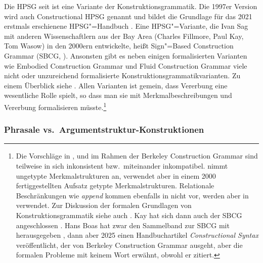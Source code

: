 Die HPSG seit  ist eine Variante der Konstruktionsgrammatik. Die 1997er Version wird auch Constructional HPSG genannt und bildet
die Grundlage für das 2021 erstmals erschienene HPSG"=Handbuch \citep{HPSGHandbook}. Eine
HPSG"=Variante, die Ivan Sag mit anderen Wissenschaftlern aus der Bay Area (Charles Fillmore, Paul
Kay, Tom Wasow) in den 2000ern entwickelte, heißt Sign"=Based Construction Grammar (SBCG,
\citealt{Sag2010b,Sag2012a}). Ansonsten gibt es neben einigen formalisierten Varianten wie Embodied
Construction Grammar \citep{BC2005a} und Fluid Construction Grammar
\citep{SDB2006a-u,SteelsFluid-ed} viele
nicht oder unzureichend formalisierte Konstruktionsgrammatikvarianten. Zu einem Überblick siehe
\citep{MuellerCxG}. Allen Varianten ist gemein, dass
Vererbung eine wesentliche Rolle spielt, so dass man sie mit Merkmalbeschreibungen und Vererbung
formalisieren müsste.\footnote{%
  Die Vorschläge in ,  und  im Rahmen der Berkeley
  Construction Grammar sind teilweise in sich inkonsistent bzw.\ miteinander inkompatibel.
\citet{Kay2002a} nimmt ungetypte Merkmalstrukturen an,
  verwendet aber in einem 2000 fertiggestellten Aufsatz \citep{Kay2005a} getypte Merkmalstrukturen. Relationale Beschränkungen
  wie \emph{append} kommen ebenfalls in  nicht vor, werden aber in 
  verwendet. 
  Zur Diskussion der formalen Grundlagen von Konstruktionsgrammatik siehe auch . Kay hat sich dann auch der SBCG angeschlossen
    \citep*{SBK2012a}. Hans Boas hat zwar den Sammelband zur SBCG mit
    herausgegeben \citep{BS2012a-ed}, dann aber 2025 einen Handbuchartikel \emph{Constructional
      Syntax} veröffentlicht, der von Berkeley Construction Grammar ausgeht, aber die formalen
    Probleme mit keinem Wort erwähnt, obwohl er  zitiert.%
}

\subsubsection{Phrasale vs.\ Argumentstruktur-Konstruktionen}
\label{sec-phrasal-lexikalisch-rc}

